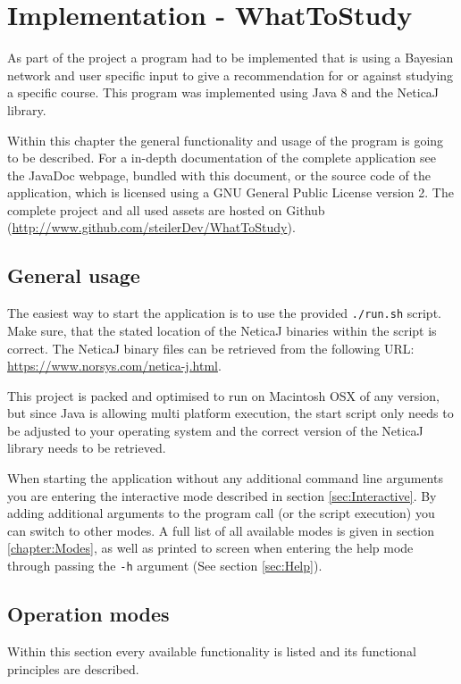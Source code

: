 \documentclass[%
	pdftex,
	oneside,        %
	11pt,           %
	parskip=half,   %
	headsepline,    %
	footsepline,    %
	abstracton,     %
	USenglish,      %
	a4paper,        %
]{report}
\begin{document}
\chapter{Implementation - WhatToStudy}
\label{chapter:WhatToStudy}
As part of the project a program had to be implemented that is using a Bayesian network and user specific input to give a recommendation for or against studying a specific course. This program was implemented using Java 8 and the NeticaJ library. 

Within this chapter the general functionality and usage of the program is going to be described. For a in-depth documentation of the complete application see the JavaDoc webpage, bundled with this document, or the source code of the application, which is licensed using a GNU General Public License version 2. The complete project and all used assets are hosted on Github (\url{http://www.github.com/steilerDev/WhatToStudy}).

\section{General usage}
The easiest way to start the application is to use the provided \texttt{./run.sh} script. Make sure, that the stated location of the NeticaJ binaries within the script is correct. The NeticaJ binary files can be retrieved from the following URL: \url{https://www.norsys.com/netica-j.html}. 

This project is packed and optimised to run on Macintosh OSX of any version, but since Java is allowing multi platform execution, the start script only needs to be adjusted to your operating system and the correct version of the NeticaJ library needs to be retrieved.

When starting the application without any additional command line arguments you are entering the interactive mode described in section \vref{sec:Interactive}. By adding additional arguments to the program call (or the script execution) you can switch to other modes. A full list of all available modes is given in section \vref{chapter:Modes}, as well as printed to screen when entering the help mode through passing the \texttt{-h} argument (See section \vref{sec:Help}).

\section{Operation modes}
\label{chapter:Modes}
Within this section every available functionality is listed and its functional principles are described.
\end{document}
